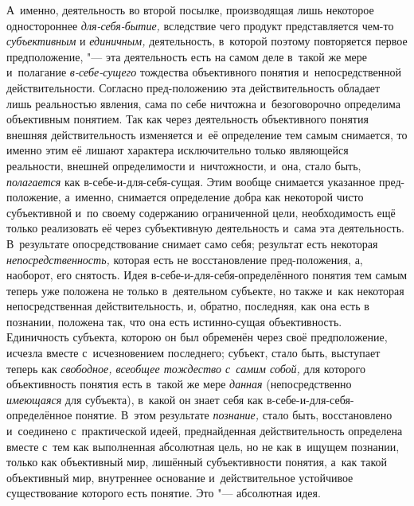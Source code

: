 А~именно, деятельность во второй посылке, производящая лишь
некоторое одностороннее
{\em для-себя-бытие,}
вследствие чего продукт представляется чем-то
{\em субъективным} и
{\em единичным,}
деятельность, в~которой поэтому повторяется первое
предположение, "--- эта деятельность есть на самом деле в~такой
же мере и~полагание {\em в-себе-сущего}
тождества объективного понятия и~непосредственной
действительности. Согласно пред-положению эта действительность
обладает лишь реальностью явления, сама по себе ничтожна и~безоговорочно
определима объективным понятием. Так как через деятельность объективного
понятия внешняя действительность изменяется и~её определение тем самым
снимается, то именно этим её лишают характера исключительно только
являющейся реальности, внешней определимости и~ничтожности, и~она, стало
быть, {\em полагается}
как в-себе-и-для-себя-сущая. Этим вообще снимается указанное
пред-положение, а~именно, снимается определение добра как некоторой чисто
субъективной и~по своему содержанию ограниченной цели, необходимость ещё
только реализовать её через субъективную деятельность и~сама эта
деятельность. В~результате опосредствование снимает само себя; результат
есть некоторая
{\em непосредственность,}
которая есть не восстановление пред-положения, а, наоборот,
его снятость. Идея в-себе-и-для-себя-определённого понятия тем самым теперь
уже положена не только в~деятельном субъекте, но также и~как некоторая
непосредственная действительность, и, обратно, последняя, как она есть в
познании, положена так, что она есть истинно-сущая объективность.
Единичность субъекта, которою он был обременён через своё предположение,
исчезла вместе с~исчезновением последнего; субъект, стало быть, выступает
теперь как {\em свободное, всеобщее
тождество с~самим собой,} для которого объективность понятия
есть в~такой же мере {\em данная}
(непосредственно
{\em имеющаяся} для
субъекта), в~какой он знает себя как в-себе-и-для-себя-определённое
понятие. В~этом результате
{\em познание,} стало
быть, восстановлено и~соединено с~практической идеей,
преднайденная действительность определена вместе с~тем как выполненная
абсолютная цель, но не как в~ищущем познании, только как объективный мир,
лишённый субъективности понятия, а~как такой объективный мир, внутреннее
основание и~действительное устойчивое существование которого есть понятие.
Это "--- абсолютная идея.

